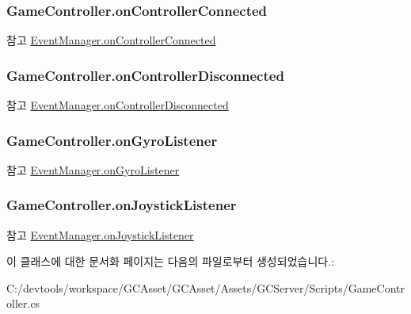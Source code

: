 \subsubsection[{on\+Controller\+Connected}]{ Game\+Controller.\+on\+Controller\+Connected}\label{class_game_controller_a32dbe49ae40c100cac70423e2ac81aa7}
\begin{DoxySeeAlso}{참고}
\hyperlink{class_event_manager_a1982ee974be3949930955adbf2b69416}{Event\+Manager.\+on\+Controller\+Connected} 
\end{DoxySeeAlso}
\hypertarget{class_game_controller_aca9c2b01d155e895c249ac05e1eb9bf4}{}
\subsubsection[{on\+Controller\+Disconnected}]{ Game\+Controller.\+on\+Controller\+Disconnected}\label{class_game_controller_aca9c2b01d155e895c249ac05e1eb9bf4}
\begin{DoxySeeAlso}{참고}
\hyperlink{class_event_manager_a8f4ec7cfc6f0ca0d4a5872997b359861}{Event\+Manager.\+on\+Controller\+Disconnected} 
\end{DoxySeeAlso}
\hypertarget{class_game_controller_ae051ab28fdc0f6bf06d1c5fbb4ad3f21}{}
\subsubsection[{on\+Gyro\+Listener}]{ Game\+Controller.\+on\+Gyro\+Listener}\label{class_game_controller_ae051ab28fdc0f6bf06d1c5fbb4ad3f21}
\begin{DoxySeeAlso}{참고}
\hyperlink{class_event_manager_a31f1da96e98896421b0026df5ce01623}{Event\+Manager.\+on\+Gyro\+Listener} 
\end{DoxySeeAlso}
\hypertarget{class_game_controller_a4ac337d799821aba5064e4e91c565eb9}{}
\subsubsection[{on\+Joystick\+Listener}]{ Game\+Controller.\+on\+Joystick\+Listener}\label{class_game_controller_a4ac337d799821aba5064e4e91c565eb9}
\begin{DoxySeeAlso}{참고}
\hyperlink{class_event_manager_ab148217093b03a8cd7c962a11195c83a}{Event\+Manager.\+on\+Joystick\+Listener} 
\end{DoxySeeAlso}


이 클래스에 대한 문서화 페이지는 다음의 파일로부터 생성되었습니다.\+:\begin{DoxyCompactItemize}
\item 
C\+:/devtools/workspace/\+G\+C\+Asset/\+G\+C\+Asset/\+Assets/\+G\+C\+Server/\+Scripts/Game\+Controller.\+cs\end{DoxyCompactItemize}
